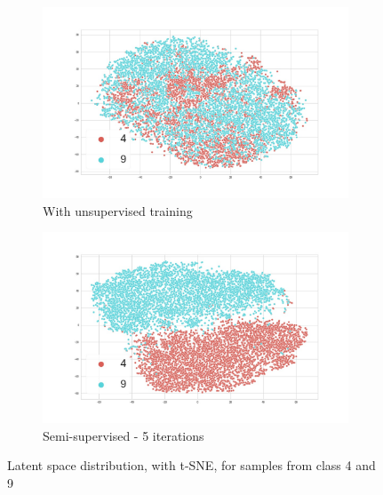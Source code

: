 \documentclass[runningheads]{llncs}
\begin{document}
\begin{figure}[!t]
\centering
\begin{subfigure}[t]{.4\textwidth}
  \centering
  \includegraphics[width=0.8\linewidth]{images/tsne_4_9_unsup.jpg}
  \caption{With unsupervised training}
  \label{tsne_un_4_9}
\end{subfigure}\hfill
\begin{subfigure}[t]{.4\textwidth}
  \centering
  \includegraphics[width=0.8\linewidth]{images/tsne_4_9_semi.jpg}
  \caption{Semi-supervised - 5 iterations}
  \label{tsne_semi_4_9}
\end{subfigure}
\caption{Latent space distribution, with t-SNE, for samples from class 4 and 9}
\label{tsne_4_9}
\end{figure}
\end{document}
